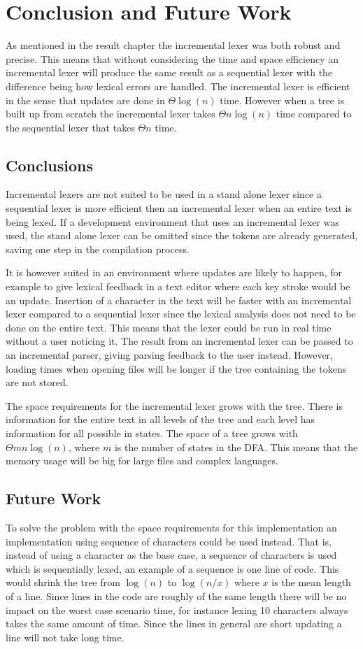 \chapter{Conclusion and Future Work \label{chap:concfuture}}
As mentioned in the result chapter the incremental lexer was both robust and
precise. This means that without considering the time and space efficiency an
incremental lexer will produce the same result as a sequential lexer with the
difference being how lexical errors are handled. The incremental lexer is
efficient in the sense that updates are done in $\Theta \log(n)$ time. However
when a tree is built up from scratch the incremental lexer takes
$\Theta n\log(n)$ time compared to the sequential lexer that takes $\Theta n$
time.

\section{Conclusions}
Incremental lexers are not suited to be used in a stand alone lexer since a
sequential lexer is more efficient then an incremental lexer when an entire text
is being lexed. If a development environment that uses an incremental lexer was
used, the stand alone lexer can be omitted since the tokens are already
generated, saving one step in the compilation process.

It is however suited in an environment where updates are likely to happen, for
example to give lexical feedback in a text editor where each key stroke would be
an update. Insertion of a character in the text will be faster with an
incremental lexer compared to a sequential lexer since the lexical analysis does
not need to be done on the entire text. This means that the lexer could be run
in real time without a user noticing it. The result from an incremental lexer
can be passed to an incremental parser, giving parsing feedback to the user
instead. However, loading times when opening files will be longer if the tree
containing the tokens are not stored.

The space requirements for the incremental lexer grows with the tree. There is
information for the entire text in all levels of the tree and each level has
information for all possible in states. The space of a tree grows with
$\Theta mn\log(n)$, where $m$ is the number of states in the DFA. This means
that the memory usage will be big for large files and complex languages.

\section{Future Work}
To solve the problem with the space requirements for this implementation an
implementation using sequence of characters could be used instead. That is,
instead of using a character as the base case, a sequence of characters is used
which is sequentially lexed, an example of a sequence is one line of code. This
would shrink the tree from $\log(n)$ to $\log(n/x)$ where $x$ is the mean length
of a line. Since lines in the code are roughly of the same length there will be
no impact on the worst case scenario time, for instance lexing 10 characters
always takes the same amount of time. Since the lines in general are short
updating a line will not take long time.


